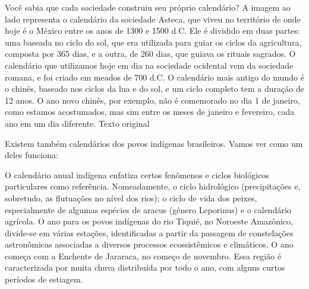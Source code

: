 


Você sabia que cada sociedade construiu seu próprio calendário? A imagem
ao lado representa o calendário da sociedade Asteca, que viveu no
território de onde hoje é o México entre os anos de 1300 e 1500 d.C. Ele
é dividido em duas partes: uma baseada no ciclo do sol, que era
utilizada para guiar os ciclos da agricultura, composta por 365 dias, e
a outra, de 260 dias, que guiava os rituais sagrados. O calendário que
utilizamos hoje em dia na sociedade ocidental vem da sociedade romana, e
foi criado em meados de 700 d.C. O calendário mais antigo do mundo é o
chinês, baseado nos ciclos da lua e do sol, e um ciclo completo tem a
duração de 12 anos. O ano novo chinês, por exemplo, não é comemorado no
dia 1 de janeiro, como estamos acostumados, mas sim entre os meses de
janeiro e fevereiro, cada ano em um dia diferente. Texto original

Existem também calendários dos povos indígenas brasileiros. Vamos ver
como um deles funciona:

O calendário anual indígena enfatiza certos fenômenos e ciclos
biológicos particulares como referência. Nomeadamente, o ciclo
hidrológico (precipitações e, sobretudo, as flutuações no nível dos
rios); o ciclo de vida dos peixes, especialmente de algumas espécies de
aracus (gênero Leporinus) e o calendário agrícola. O ano para os povos
indígenas do rio Tiquié, no Noroeste Amazônico, divide-se em várias
estações, identificadas a partir da passagem de constelações
astronômicas associadas a diversos processos ecossistêmicos e
climáticos. O ano começa com a Enchente de Jararaca, no começo de
novembro. Essa região é caracterizada por muita chuva distribuída por
todo o ano, com alguns curtos períodos de estiagem.

